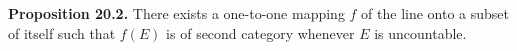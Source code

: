 \textbf{Proposition 20.2.} There exists a one-to-one mapping $f$ of the line onto a subset of itself such that $f(E)$ is of second category whenever $E$ is uncountable.
